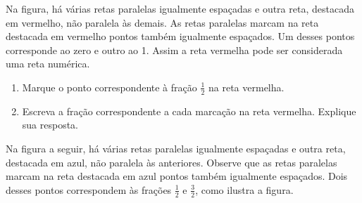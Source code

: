 \begin{atividade}{}

Na figura, há várias retas paralelas igualmente espaçadas e outra reta, destacada em vermelho, não paralela às demais. As retas paralelas marcam na reta destacada em vermelho pontos também igualmente espaçados. Um desses pontos corresponde ao zero e outro ao 1. Assim a reta vermelha pode ser considerada uma reta numérica.

\begin{center}
\end{center}

\begin{enumerate} [\quad a)] %
  \item     Marque o ponto correspondente à fração $\frac{1}{2}$ na reta vermelha.
  \item     Escreva a fração correspondente a cada marcação na reta vermelha. Explique sua resposta.    \mbox{} \newline
  \end{enumerate}
  
  Na figura a seguir, há várias retas paralelas igualmente espaçadas e outra reta, destacada em azul, não paralela às anteriores. Observe que as retas paralelas marcam na reta destacada em azul pontos também igualmente espaçados. Dois desses pontos correspondem às frações $\frac{1}{2}$ e $\frac{3}{2}$, como ilustra a figura.

  \begin{center}
\end{center}
\end{atividade}
